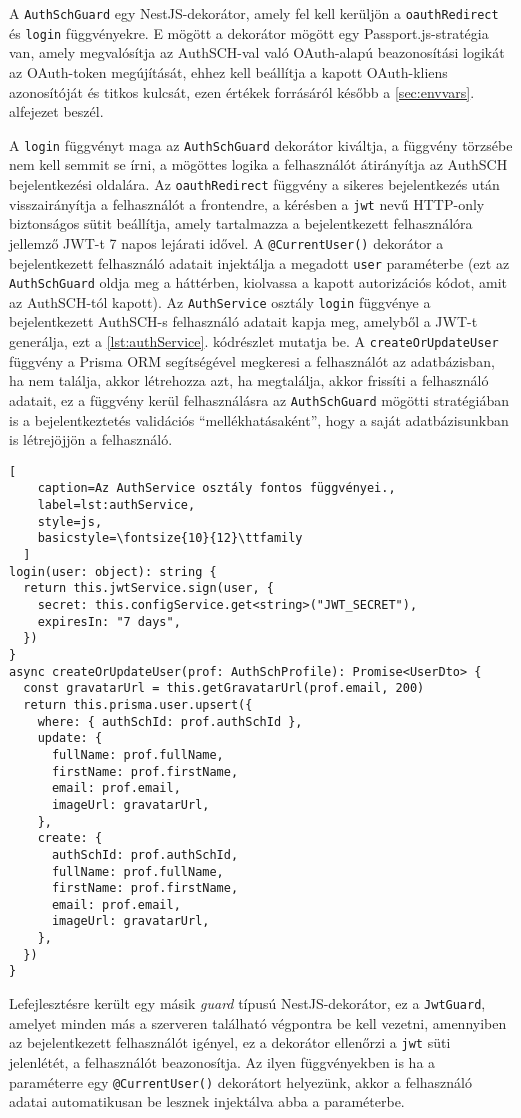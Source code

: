 A \verb|AuthSchGuard| egy NestJS-dekorátor, amely fel kell kerüljön a \verb|oauthRedirect| és \verb|login| függvényekre. E mögött a dekorátor mögött egy Passport.js-stratégia\cite{passport} van, amely megvalósítja az AuthSCH-val való OAuth-alapú beazonosítási logikát az OAuth-token megújítását, ehhez kell beállítja a kapott OAuth-kliens azonosítóját és titkos kulcsát, ezen értékek forrásáról később a \ref{sec:envvars}. alfejezet beszél.

A \verb|login| függvényt maga az \verb|AuthSchGuard| dekorátor kiváltja, a függvény törzsébe nem kell semmit se írni, a mögöttes logika a felhasználót átirányítja az AuthSCH bejelentkezési oldalára. Az \verb|oauthRedirect| függvény a sikeres bejelentkezés után visszairányítja a felhasználót a frontendre, a kérésben a \verb|jwt| nevű HTTP-only biztonságos sütit beállítja, amely tartalmazza a bejelentkezett felhasználóra jellemző JWT-t 7 napos lejárati idővel. A \verb|@CurrentUser()| dekorátor a bejelentkezett felhasználó adatait injektálja a megadott \verb|user| paraméterbe (ezt az \verb|AuthSchGuard| oldja meg a háttérben, kiolvassa a kapott autorizációs kódot, amit az AuthSCH-tól kapott). Az \verb|AuthService| osztály \verb|login| függvénye a bejelentkezett AuthSCH-s felhasználó adatait kapja meg, amelyből a JWT-t generálja, ezt a \ref{lst:authService}. kódrészlet mutatja be. A \verb|createOrUpdateUser| függvény a Prisma ORM segítségével megkeresi a felhasználót az adatbázisban, ha nem találja, akkor létrehozza azt, ha megtalálja, akkor frissíti a felhasználó adatait, ez a függvény kerül felhasználásra az \verb|AuthSchGuard| mögötti stratégiában is a bejelentkeztetés validációs ``mellékhatásaként'', hogy a saját adatbázisunkban is létrejöjjön a felhasználó.

\begin{minipage}{0.92\textwidth}
  \begin{lstlisting}[
    caption=Az AuthService osztály fontos függvényei.,
    label=lst:authService,
    style=js,
    basicstyle=\fontsize{10}{12}\ttfamily
  ]
login(user: object): string {
  return this.jwtService.sign(user, {
    secret: this.configService.get<string>("JWT_SECRET"),
    expiresIn: "7 days",
  })
}
async createOrUpdateUser(prof: AuthSchProfile): Promise<UserDto> {
  const gravatarUrl = this.getGravatarUrl(prof.email, 200)
  return this.prisma.user.upsert({
    where: { authSchId: prof.authSchId },
    update: {
      fullName: prof.fullName,
      firstName: prof.firstName,
      email: prof.email,
      imageUrl: gravatarUrl,
    },
    create: {
      authSchId: prof.authSchId,
      fullName: prof.fullName,
      firstName: prof.firstName,
      email: prof.email,
      imageUrl: gravatarUrl,
    },
  })
}
\end{lstlisting}
\end{minipage}

Lefejlesztésre került egy másik \emph{guard} típusú NestJS-dekorátor, ez a \verb|JwtGuard|, amelyet minden más a szerveren található végpontra be kell vezetni, amennyiben az bejelentkezett felhasználót igényel, ez a dekorátor ellenőrzi a \verb|jwt| süti jelenlétét, a felhasználót beazonosítja. Az ilyen függvényekben is ha a paraméterre egy \verb|@CurrentUser()| dekorátort helyezünk, akkor a felhasználó adatai automatikusan be lesznek injektálva abba a paraméterbe.
